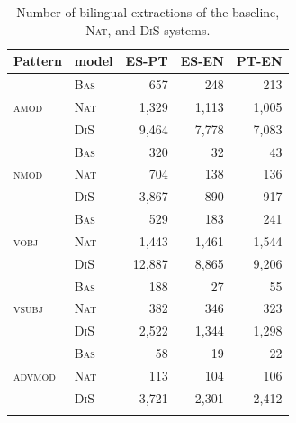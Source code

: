\documentclass[output=paper,modfonts,nonflat]{langsci/langscibook}
\begin{document}
\begin{table}
  \begin{center}
    \caption{\label{tab:extract} Number of bilingual extractions of the baseline,
      \textsc{Nat}, and \textsc{DiS} systems.}
    \begin{tabular}{llrrr}
      \lsptoprule
      \textbf{Pattern} & \textbf{model} & \textbf{ES-PT} & \textbf{ES-EN} & \textbf{PT-EN}\\
      \midrule
	\multirow{3}{*}{\textsc{amod}} & \textsc{Bas} & 657 & 248 & 213\\ 
	& \textsc{Nat} & 1,329 & 1,113 & 1,005\\ 
	& \textsc{DiS} & 9,464 & 7,778 & 7,083\\ \midrule
	\multirow{3}{*}{\textsc{nmod}} & \textsc{Bas} & 320 & 32 & 43\\ 
	& \textsc{Nat} & 704 & 138 & 136\\ 
	& \textsc{DiS} & 3,867 & 890 & 917\\ \midrule
	\multirow{3}{*}{\textsc{vobj}} & \textsc{Bas} & 529 & 183 & 241\\ 
	& \textsc{Nat} & 1,443 & 1,461 & 1,544\\ 
	& \textsc{DiS} & 12,887 & 8,865 & 9,206\\ \midrule
	\multirow{3}{*}{\textsc{vsubj}} & \textsc{Bas} & 188 & 27 & 55\\ 
	& \textsc{Nat} & 382 & 346 & 323\\ 
	& \textsc{DiS} & 2,522 & 1,344 & 1,298\\ \midrule
	\multirow{3}{*}{\textsc{advmod}} & \textsc{Bas} & 58 & 19 & 22\\ 
	& \textsc{Nat} & 113 & 104 & 106\\ 
	& \textsc{DiS} & 3,721 & 2,301 & 2,412\\
      \lspbottomrule
    \end{tabular}
  \end{center}
\end{table}
\end{document}
